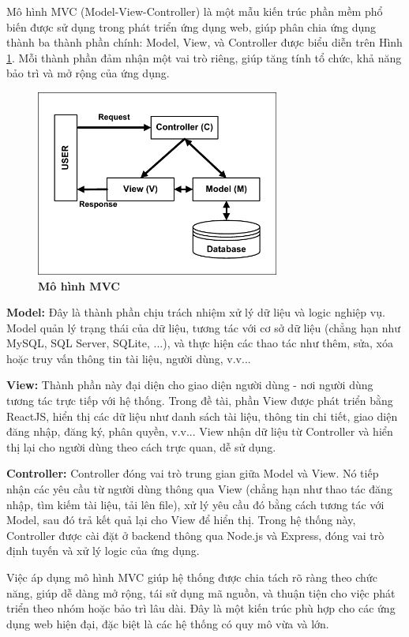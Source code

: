 \documentclass{article}
\begin{document}
	Mô hình MVC (Model-View-Controller) là một mẫu kiến trúc phần mềm phổ biến được sử dụng trong phát triển ứng dụng web, giúp phân chia ứng dụng thành ba thành phần chính: Model, View, và Controller được biểu diễn trên Hình \ref{fig21}. Mỗi thành phần đảm nhận một vai trò riêng, giúp tăng tính tổ chức, khả năng bảo trì và mở rộng của ứng dụng. 
	
	\begin{figure}[!ht]
		\centering
		\includegraphics[trim= 10pt 10pt 10pt 10pt, clip, width=8cm]{mvc_fig21.pdf}
		\caption[Mô hình MVC]{\bfseries \fontsize{12pt}{0pt}\selectfont Mô hình MVC}
		\label{fig21}
	\end{figure}
	
	\textbf{Model:} Đây là thành phần chịu trách nhiệm xử lý dữ liệu và logic nghiệp vụ. Model quản lý trạng thái của dữ liệu, tương tác với cơ sở dữ liệu (chẳng hạn như MySQL, SQL Server, SQLite, ...), và thực hiện các thao tác như thêm, sửa, xóa hoặc truy vấn thông tin tài liệu, người dùng, v.v...
	
	\textbf{View:} Thành phần này đại diện cho giao diện người dùng - nơi người dùng tương tác trực tiếp với hệ thống. Trong đề tài, phần View được phát triển bằng ReactJS, hiển thị các dữ liệu như danh sách tài liệu, thông tin chi tiết, giao diện đăng nhập, đăng ký, phân quyền, v.v... View nhận dữ liệu từ Controller và hiển thị lại cho người dùng theo cách trực quan, dễ sử dụng.
	
	\textbf{Controller:} Controller đóng vai trò trung gian giữa Model và View. Nó tiếp nhận các yêu cầu từ người dùng thông qua View (chẳng hạn như thao tác đăng nhập, tìm kiếm tài liệu, tải lên file), xử lý yêu cầu đó bằng cách tương tác với Model, sau đó trả kết quả lại cho View để hiển thị. Trong hệ thống này, Controller được cài đặt ở backend thông qua Node.js và Express, đóng vai trò định tuyến và xử lý logic của ứng dụng.
	
	Việc áp dụng mô hình MVC giúp hệ thống được chia tách rõ ràng theo chức năng, giúp dễ dàng mở rộng, tái sử dụng mã nguồn, và thuận tiện cho việc phát triển theo nhóm hoặc bảo trì lâu dài. Đây là một kiến trúc phù hợp cho các ứng dụng web hiện đại, đặc biệt là các hệ thống có quy mô vừa và lớn.
	
\end{document}
